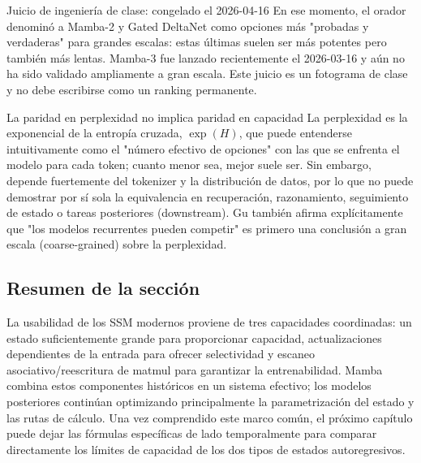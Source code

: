 
\begin{knowledgebox}{Juicio de ingeniería de clase: congelado el 2026-04-16}
En ese momento, el orador denominó a Mamba-2 y Gated DeltaNet como opciones más "probadas y verdaderas" para grandes escalas: estas últimas suelen ser más potentes pero también más lentas. Mamba-3 fue lanzado recientemente el 2026-03-16 y aún no ha sido validado ampliamente a gran escala. Este juicio es un fotograma de clase y no debe escribirse como un ranking permanente.
\end{knowledgebox}

\begin{warningbox}{La paridad en perplexidad no implica paridad en capacidad}
La perplexidad es la exponencial de la entropía cruzada, $\exp(H)$, que puede entenderse intuitivamente como el "número efectivo de opciones" con las que se enfrenta el modelo para cada token; cuanto menor sea, mejor suele ser. Sin embargo, depende fuertemente del tokenizer y la distribución de datos, por lo que no puede demostrar por sí sola la equivalencia en recuperación, razonamiento, seguimiento de estado o tareas posteriores (downstream). Gu también afirma explícitamente que "los modelos recurrentes pueden competir" es primero una conclusión a gran escala (coarse-grained) sobre la perplexidad.
\end{warningbox}

\subsection{Resumen de la sección}

La usabilidad de los SSM modernos proviene de tres capacidades coordinadas: un estado suficientemente grande para proporcionar capacidad, actualizaciones dependientes de la entrada para ofrecer selectividad y escaneo asociativo/reescritura de matmul para garantizar la entrenabilidad. Mamba combina estos componentes históricos en un sistema efectivo; los modelos posteriores continúan optimizando principalmente la parametrización del estado y las rutas de cálculo. Una vez comprendido este marco común, el próximo capítulo puede dejar las fórmulas específicas de lado temporalmente para comparar directamente los límites de capacidad de los dos tipos de estados autoregresivos.


